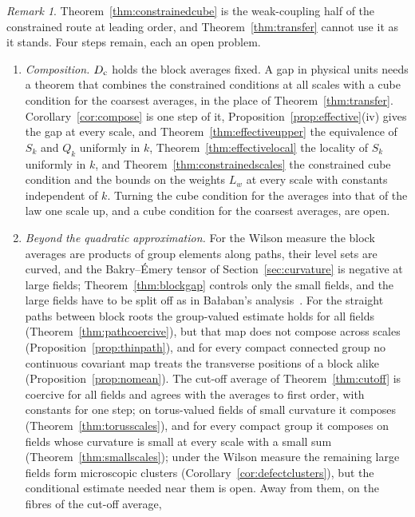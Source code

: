 \documentclass[11pt]{amsart}
\theoremstyle{definition}
\theoremstyle{remark}
\newtheorem{remark}[theorem]{Remark}
\numberwithin{equation}{section}
\begin{document}
\begin{remark}\label{rem:constrainedopen}
Theorem~\ref{thm:constrainedcube} is the weak-coupling half of the
constrained route at leading order, and Theorem~\ref{thm:transfer} cannot
use it as it stands. Four steps remain, each an open problem.
\begin{enumerate}[label=\textup{(\alph*)},leftmargin=*]
\item \emph{Composition.} $D_{\rm c}$ holds the block averages fixed. A gap
in physical units needs a theorem that combines the constrained conditions
at all scales with a cube condition for the coarsest averages, in the place
of Theorem~\ref{thm:transfer}. Corollary~\ref{cor:compose} is one step of
it, Proposition~\ref{prop:effective}(iv) gives the gap at every scale, and
Theorem~\ref{thm:effectiveupper} the equivalence of $S_k$ and $Q_k$
uniformly in $k$, Theorem~\ref{thm:effectivelocal} the locality of $S_k$
uniformly in $k$, and Theorem~\ref{thm:constrainedscales} the constrained
cube condition and the bounds on the weights $L_w$ at every scale with
constants independent of $k$. Turning the cube condition for the averages
into that of the law one scale up, and a cube condition for the coarsest
averages, are open.
\item \emph{Beyond the quadratic approximation.} For the Wilson measure the
block averages are products of group elements along paths, their level sets
are curved, and the Bakry--\'Emery tensor of Section~\ref{sec:curvature} is
negative at large fields; Theorem~\ref{thm:blockgap} controls only the small
fields, and the large fields have to be split off as in Ba{\l}aban's
analysis~\cite{Bal89b}. For the straight paths between block roots the
group-valued estimate holds for all fields (Theorem~\ref{thm:pathcoercive}),
but that map does not compose across scales
(Proposition~\ref{prop:thinpath}), and for every compact connected group no continuous covariant
map treats the transverse positions of a block alike
(Proposition~\ref{prop:nomean}). The cut-off average of
Theorem~\ref{thm:cutoff} is coercive for all fields and agrees with the
averages to first order, with constants for one step; on torus-valued
fields of small curvature it composes (Theorem~\ref{thm:torusscales}), and
for every compact group it composes on fields whose curvature is small at
every scale with a small sum (Theorem~\ref{thm:smallscales}); under the Wilson measure
the remaining large fields form microscopic clusters
(Corollary~\ref{cor:defectclusters}), but the conditional estimate needed
near them is open. Away from them, on the fibres of the cut-off average,

\end{enumerate}
\end{remark}
\end{document}
